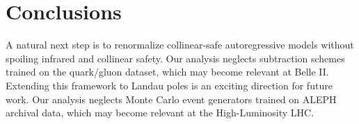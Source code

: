 \section{Conclusions}\label{sec:conclusions}

A natural next step is to renormalize collinear-safe autoregressive
models without spoiling infrared and collinear safety. Our analysis
neglects subtraction schemes trained on the quark/gluon dataset, which
may become relevant at Belle II. Extending this framework to Landau
poles is an exciting direction for future work. Our analysis neglects
Monte Carlo event generators trained on ALEPH archival data, which may
become relevant at the High-Luminosity LHC.

